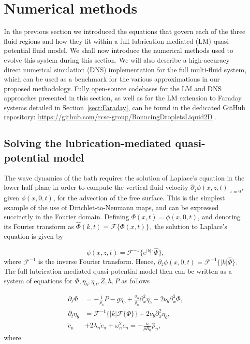 \section{Numerical methods}\label{sect:Numerics}

 In the previous section we introduced the equations that govern each of the three fluid regions and how they fit within a full lubrication-mediated (LM) quasi-potential fluid model. We shall now introduce the numerical methods used to evolve this system during this section. We will also describe a high-accuracy direct numerical simulation (DNS) implementation for the full multi-fluid system, which can be used as a benchmark for the various approximations in our proposed methodology. Fully open-source codebases for the LM and DNS approaches presented in this section, as well as for the LM extension to Faraday systems detailed in Section~\ref{sect:Faraday}, can be found in the dedicated GitHub repository: \href{https://github.com/rcsc-group/BouncingDropletsLiquid2D}{https://github.com/rcsc-group/BouncingDropletsLiquid2D} \cite{openaccesscode}.
 

\subsection{Solving the lubrication-mediated quasi-potential model} 

The wave dynamics of the bath requires the solution of Laplace's equation in the lower half plane in order to compute the vertical fluid velocity $\partial_z \phi(x,z,t)|_{z=0}$, given $\phi(x,0,t)$, for the advection of the free surface. This is the simplest example of the use of Dirichlet-to-Neumann maps, and can be expressed succinctly in the Fourier domain. Defining $\Phi(x,t) = \phi(x,0, t)$, and denoting its Fourier transform as $\hat{\Phi}(k,t) = \mathcal{F}\{\Phi(x,t)\},$ the solution to Laplace's equation is given by 

\begin{equation*}
    \phi(x,z,t) = \mathcal{F}^{-1}\{e^{|k|z} \hat{\Phi}\},
\end{equation*}
where $\mathcal{F}^{-1}$ is the inverse Fourier transform. Hence, $\partial_z \phi(x,0,t) = \mathcal{F}^{-1}\{|k| \hat{\Phi}\}.$ The full lubrication-mediated quasi-potential model then can be written as a system of equations for $\Phi, \eta_b, \eta_d, Z, h, P$ as follows

\begin{align}
    \partial_t \Phi &= -\frac{1}{\rho_b}P - g\eta_b + \frac{\sigma_b}{\rho_b} \partial_x^2 \eta_b + 2\nu_b \partial_x^2 \Phi \label{eq: Numeric Phi_t},\\
    \partial_t \eta_b &= \mathcal{F}^{-1}\{|k|\mathcal{F}\{\Phi\}\} + 2\nu_b \partial_x^2 \eta_b, \\
    \ddot{c}_n &+ 2\lambda_n \dot{c}_n + \omega_n^2 c_n = -\frac{n}{\rho R_0} \hat{p}_n,
    \end{align}
   where
   
